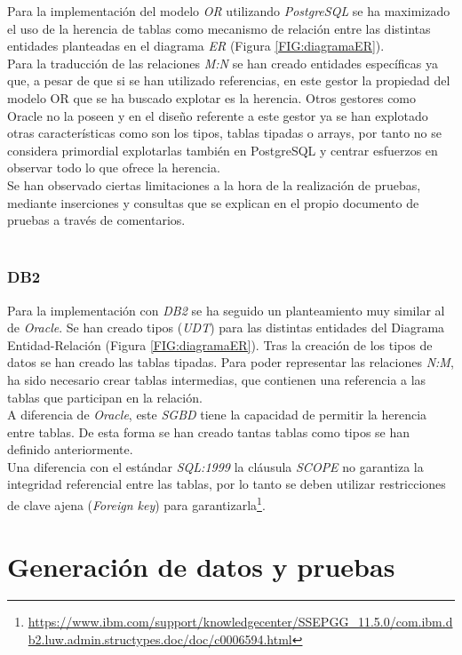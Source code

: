 \documentclass{article}
\begin{document}
Para la implementación del modelo \emph{OR} utilizando \emph{PostgreSQL} se ha maximizado el uso de la herencia de tablas como mecanismo de relación entre las distintas entidades planteadas en el diagrama \emph{ER} (Figura \ref{FIG:diagramaER}).\\
Para la traducción de las relaciones \emph{M:N} se han creado entidades específicas ya que, a pesar de que si se han utilizado referencias, en este gestor la propiedad del modelo OR que se ha buscado explotar es la herencia. Otros gestores como Oracle no la poseen y en el diseño referente a este gestor ya se han explotado otras características como son los tipos, tablas tipadas o arrays, por tanto no se considera primordial explotarlas también en PostgreSQL y centrar esfuerzos en observar todo lo que ofrece la herencia.\\
Se han observado ciertas limitaciones a la hora de la realización de pruebas, mediante inserciones y consultas que se explican en el propio documento de pruebas a través de comentarios.\\
\\

\subsubsection{DB2}

Para la implementación con \emph{DB2} se ha seguido un planteamiento muy similar al de \emph{Oracle}. Se han creado tipos (\emph{UDT}) para las distintas entidades del Diagrama Entidad-Relación (Figura \ref{FIG:diagramaER}). Tras la creación de los tipos de datos se han creado las tablas tipadas. Para poder representar las relaciones \emph{N:M}, ha sido necesario crear tablas intermedias, que contienen una referencia a las tablas que participan en la relación.\\
A diferencia de \emph{Oracle}, este \emph{SGBD} tiene la capacidad de permitir la herencia entre tablas. De esta forma se han creado tantas tablas como tipos se han definido anteriormente.\\
Una diferencia con 
el estándar \emph{SQL:1999} la cláusula \emph{SCOPE} no garantiza la integridad referencial entre las tablas, por lo tanto se deben utilizar restricciones de clave ajena (\emph{Foreign key}) para garantizarla\footnote{\url{https://www.ibm.com/support/knowledgecenter/SSEPGG_11.5.0/com.ibm.db2.luw.admin.structypes.doc/doc/c0006594.html}}.
\\

\section{Generación de datos y pruebas}
\end{document}
